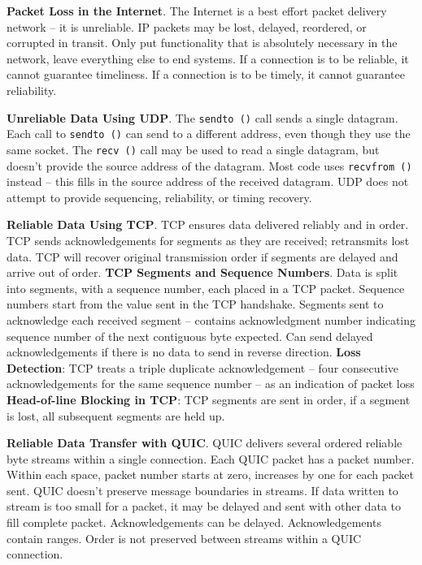 \documentclass{article}
\begin{document}
\textbf{Packet Loss in the Internet}.
The Internet is a best effort packet delivery network – it is unreliable.
IP packets may be lost, delayed, reordered, or corrupted in transit.
Only put functionality that is absolutely necessary in the network, leave everything else to end systems.
If a connection is to be reliable, it cannot guarantee timeliness.
If a connection is to be timely, it cannot guarantee reliability.

\textbf{Unreliable Data Using UDP}.
The \texttt{sendto ()} call sends a single datagram.
Each call to \texttt{sendto ()} can send to a different address, even though they use the same socket.
The \texttt{recv ()} call may be used to read a single datagram, but doesn’t provide the source address of the datagram.
Most code uses \texttt{recvfrom ()} instead – this fills in the source address of the received datagram.
UDP does not attempt to provide sequencing, reliability, or timing recovery.

\textbf{Reliable Data Using TCP}.
TCP ensures data delivered reliably and in order.
TCP sends acknowledgements for segments as they are received; retransmits lost data.
TCP will recover original transmission order if segments are delayed and arrive out of order.
\textbf{TCP Segments and Sequence Numbers}. Data is split into segments, with a sequence number, each placed in a TCP packet.
Sequence numbers start from the value sent in the TCP handshake.
Segments sent to acknowledge each received segment – contains acknowledgment number indicating sequence number of the next
contiguous byte expected.
Can send delayed acknowledgements if there is no data to send in reverse direction.
\textbf{Loss Detection}: TCP treats a triple duplicate acknowledgement – four consecutive acknowledgements for the same sequence
number – as an indication of packet loss
\textbf{Head-of-line Blocking in TCP}: TCP segments are sent in order, if a segment is lost, all subsequent segments are held up.

\textbf{Reliable Data Transfer with QUIC}.
QUIC delivers several ordered reliable byte streams within a single connection.
Each QUIC packet has a packet number.
Within each space, packet number starts at zero, increases by one for each packet sent.
QUIC doesn’t preserve message boundaries in streams.
If data written to stream is too small for a packet, it may be
delayed and sent with other data to fill complete packet.
Acknowledgements can be delayed.
Acknowledgements contain ranges.
Order is not preserved between streams within a QUIC connection.
\end{document}
